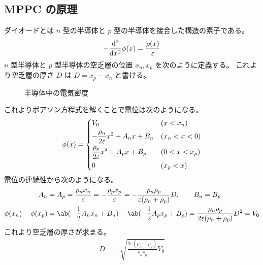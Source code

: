 \documentclass[uplatex,dvipdfmx,a4paper,11pt]{jlreq}
\numberwithin{equation}{section}
\theoremstyle{definition}
\begin{document}
\subsection{MPPC の原理}
ダイオードとは $n$ 型の半導体と $p$ 型の半導体を接合した構造の素子である。
\begin{align}
  -\diff[2]{}{x}\phi(x) = \frac{\rho(x)}{\varepsilon}
\end{align}
$n$ 型半導体と $p$ 型半導体の空乏層の位置 $x_n, x_p$ を次のように定義する。
これより空乏層の厚さ $D$ は $D = x_p - x_n$ と書ける。
\begin{figure}[htbp]
  \centering
  \caption{半導体中の電気密度}
  \label{fig:kubosou rho}
\end{figure}
これよりポアソン方程式を解くことで電位は次のようになる。
\begin{align}
  \phi(x) = \begin{dcases}
              V_0                                          & (x < x_n)     \\
              -\frac{\rho_n}{2\varepsilon}x^2 + A_nx + B_n & (x_n < x < 0) \\
              \frac{\rho_p}{2\varepsilon}x^2 + A_px + B_p  & (0 < x < x_p) \\
              0                                            & (x_p < x)
            \end{dcases}
\end{align}
電位の連続性から次のようになる。
\begin{align}
  A_n                   & = A_p = \frac{\rho_nx_n}{\varepsilon} = -\frac{\rho_px_p}{\varepsilon} = -\frac{\rho_n\rho_p}{\varepsilon(\rho_n + \rho_p)}D, \qquad B_n = B_p \\
  \phi(x_n) - \phi(x_p) & = \ab(-\frac{1}{2}A_nx_n + B_n) - \ab(-\frac{1}{2}A_px_p + B_p) = \frac{\rho_n\rho_p}{2\varepsilon(\rho_n + \rho_p)}D^2 = V_0
\end{align}
これより空乏層の厚さが求まる。
\begin{align}
  D & = \sqrt{\frac{2\varepsilon(\rho_n + \rho_p)}{\rho_n\rho_p}V_0}
\end{align}
\end{document}
